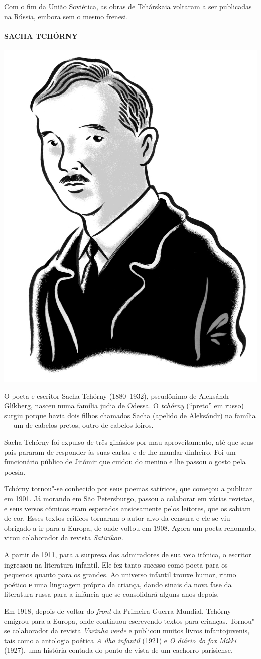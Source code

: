 {Com o fim da União Soviética, as obras de Tchárskaia voltaram a ser
publicadas na Rússia, embora sem o mesmo frenesi.

\paragraph{SACHA TCHÓRNY}

\noindent\includegraphics[width=.8in]{./imgs/autor11.jpg}

\noindent{}O poeta e escritor Sacha Tchórny (1880--1932), pseudônimo de Aleksándr
Glíkberg, nasceu numa família judia de Odessa. O \emph{tchórny}
(``preto'' em russo) surgiu porque havia dois filhos chamados Sacha
(apelido de Aleksándr) na família --- um de cabelos pretos, outro de
cabelos loiros.

Sacha Tchórny foi expulso de três ginásios por mau aproveitamento, até
que seus pais pararam de responder às suas cartas e de lhe mandar
dinheiro. Foi um funcionário público de Jitómir que cuidou do menino e
lhe passou o gosto pela poesia.

Tchórny tornou"-se conhecido por seus poemas satíricos, que começou a
publicar em 1901. Já morando em São Petersburgo, passou a colaborar em
várias revistas, e seus versos cômicos eram esperados ansiosamente pelos
leitores, que os sabiam de cor. Esses textos críticos tornaram o autor
alvo da censura e ele se viu obrigado a ir para a Europa, de onde voltou
em 1908. Agora um poeta renomado, virou colaborador da revista
\emph{Satirikon.}

A partir de 1911, para a surpresa dos admiradores de sua veia irônica, o
escritor ingressou na literatura infantil. Ele fez tanto sucesso como
poeta para os pequenos quanto para os grandes. Ao universo infantil
trouxe humor, ritmo poético е uma linguagem própria da criança, dando
sinais da nova fase da literatura russa para a infância que se
consolidará alguns anos depois.

Em 1918, depois de voltar do \emph{front} da Primeira Guerra Mundial,
Tchórny emigrou para a Europa, onde continuou escrevendo textos para
crianças. Tornou"-se colaborador da revista \emph{Varinha verde} e
publicou muitos livros infantojuvenis, tais como a antologia poética
\emph{A ilha infantil} (1921) e \emph{O diário do fox Mikki}
(1927), uma história contada do ponto de vista de um cachorro
parisiense.

}

